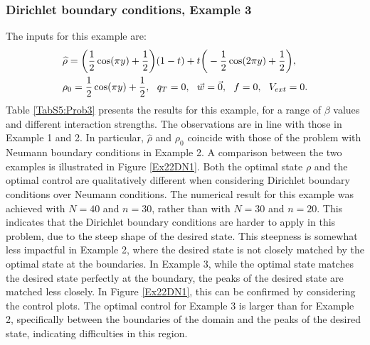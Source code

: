 \subsubsection{Dirichlet boundary conditions, Example 3} 
The inputs for this example are:
\begin{align*}
&\widehat \rho = \bigg(\frac{1}{2}\cos(\pi y) + \frac{1}{2}\bigg)(1-t) + t\bigg(-\frac{1}{2}\cos(2 \pi y) + \frac{1}{2}\bigg),\\
&\rho_{0} = \frac{1}{2}\cos(\pi y) + \frac{1}{2},\ \
q_{T} = 0,\ \
\vec{w} = \vec{0},\ \
f =0,\ \
V_{ext} =0.
\end{align*}
Table \ref{TabS5:Prob3} presents the results for this example, for a range of $\beta$ values and different interaction strengths. The observations are in line with those in Example 1 and 2. In particular, $ \widehat \rho$ and $\rho_0$ coincide with those of the problem with Neumann boundary conditions in Example 2. A comparison between the two examples is illustrated in Figure \ref{Ex22DN1}. Both the optimal state $\rho$ and the optimal control are qualitatively different when considering Dirichlet boundary conditions over Neumann conditions. The numerical result for this example was achieved with $N=40$ and $n = 30$, rather than with $N=30$ and $n=20$. This indicates that the Dirichlet boundary conditions are harder to apply in this problem, due to the steep shape of the desired state. This steepness is somewhat less impactful in Example 2, where the desired state is not closely matched by the optimal state at the boundaries. In Example 3, while the optimal state matches the desired state perfectly at the boundary, the peaks of the desired state are matched less closely. In Figure \ref{Ex22DN1}, this can be confirmed by considering the control plots. The optimal control for Example 3 is larger than for Example 2, specifically between the boundaries of the domain and the peaks of the desired state, indicating difficulties in this region.
